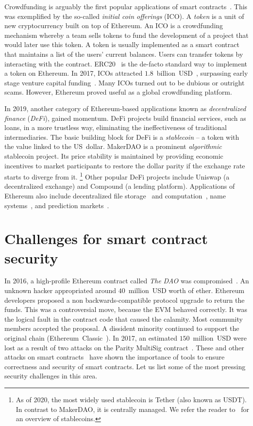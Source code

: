 Crowdfunding is arguably the first popular applications of smart contracts~\cite{McAdams2017}.
This was exemplified by the so-called \textit{initial coin offerings} (ICO).
A \textit{token} is a unit of new cryptocurrency built on top of Ethereum.
An ICO is a crowdfunding mechanism whereby a team sells tokens to fund the development of a project that would later use this token.
A token is usually implemented as a smart contract that maintains a list of the users' current balances.
Users can transfer tokens by interacting with the contract.
ERC20~\cite{Victor2019} is the de-facto standard way to implement a token on Ethereum.
In 2017, ICOs attracted $1.8$~billion~USD~\cite{CoindeakICOTracker}, surpassing early stage venture capital funding~\cite{Sunnarborg2017}.
Many ICOs turned out to be dubious or outright scams.
However, Ethereum proved useful as a global crowdfunding platform.

In 2019, another category of Ethereum-based applications known as \textit{decentralized finance} (\textit{DeFi}), gained momentum.
DeFi projects build financial services, such as loans, in a more trustless way, eliminating the ineffectiveness of traditional intermediaries.
The basic building block for DeFi is a \textit{stablecoin} -- a token with the value linked to the US~dollar.
MakerDAO is a prominent \textit{algorithmic} stablecoin project.
Its price stability is maintained by providing economic incentives to market participants to restore the dollar parity if the exchange rate starts to diverge from it.
\footnote{As of 2020, the most widely used stablecoin is Tether (also known as USDT). In contrast to MakerDAO, it is centrally managed. We refer the reader to~\cite{Clark2020,KlagesMundt2020} for an overview of stablecoins.}
Other popular DeFi projects include Uniswap (a decentralized exchange) and Compound (a lending platform).
Applications of Ethereum also include decentralized file storage~\cite{Storj} and computation~\cite{Golem}, name systems~\cite{ENS}, and prediction markets~\cite{Augur, Gnosis}.


\section{Challenges for smart contract security}

In 2016, a high-profile Ethereum contract called \textit{The DAO} was compromised~\cite{Sirer2016}.
An unknown hacker appropriated around $40$~million~USD worth of ether.
Ethereum developers proposed a non backwards-compatible protocol upgrade to return the funds.
This was a controversial move, because the EVM behaved correctly.
It was the logical fault in the contract code that caused the calamity.
Most community members accepted the proposal.
A dissident minority continued to support the original chain (Ethereum~Classic~\cite{EthereumClassic}).
In 2017, an estimated $150$~million~USD were lost as a result of two attacks on the Parity MultiSig contract~\cite{Palladino2017}.
These and other attacks on smart contracts~\cite{Delmolino2016, Atzei2017} have shown the importance of tools to ensure correctness and security of smart contracts.
Let us list some of the most pressing security challenges in this area.

